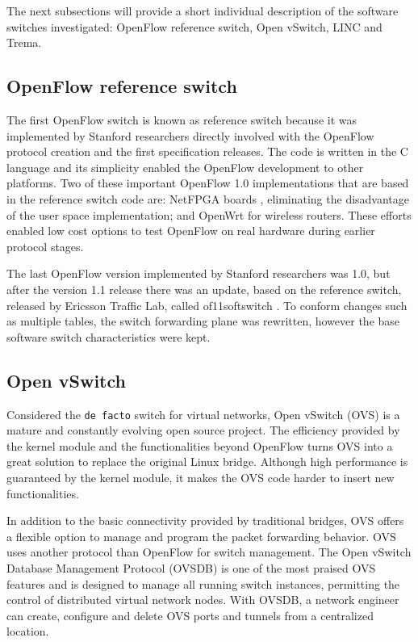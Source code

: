 The next subsections will provide a short individual description of the software switches investigated: OpenFlow reference switch, Open vSwitch, LINC and Trema. 

    \subsection{OpenFlow reference switch}
    \label{sec:sec221}
    
     The first OpenFlow switch is known as reference switch because it was implemented by Stanford researchers directly involved with the OpenFlow protocol creation and the first specification releases. The code is written in the C language and its simplicity enabled the OpenFlow development to other platforms. Two of these important OpenFlow 1.0 implementations that are based in the reference switch code are: NetFPGA boards \cite{netpfgaof}, eliminating the disadvantage of the user space implementation; and OpenWrt \cite{pantou} for wireless routers. These efforts enabled low cost options to test OpenFlow on real hardware during earlier protocol stages.    
     
     The last OpenFlow version implemented by Stanford researchers was 1.0, but after the version 1.1 release there was an update, based on the reference switch, released by Ericsson Traffic Lab, called of11softswitch \cite{of11softswitch}. To conform changes such as multiple tables, the switch forwarding plane was rewritten, however the base software switch characteristics were kept.     

     \subsection{Open vSwitch}
    
    Considered the \texttt{de facto} switch for virtual networks, Open vSwitch \cite{Pfaff_e.a.:extending} (OVS) is a mature and constantly evolving open source project. The efficiency provided by the kernel module and the functionalities beyond OpenFlow turns OVS into a great solution to replace the original Linux bridge. Although high performance is guaranteed by the kernel module, it makes the OVS code harder to insert new functionalities. 
    
    In addition to the basic connectivity provided by traditional bridges, OVS offers a flexible option to manage and program the packet forwarding behavior. OVS uses another protocol than OpenFlow for switch management. The Open vSwitch Database Management Protocol (OVSDB) is one of the most praised OVS features and is designed to manage all running switch instances, permitting the control of distributed virtual network nodes. With OVSDB, a network engineer can create, configure and delete OVS ports and tunnels from a centralized location.

